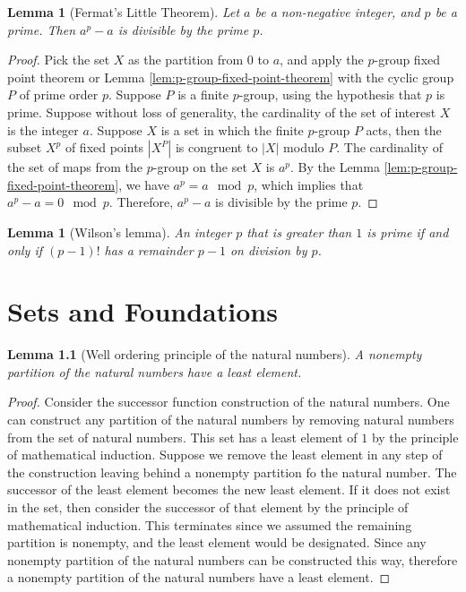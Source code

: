 \documentclass{tufte-book}
\newtheorem{lemma}[theorem]{Lemma}
\begin{document}
\begin{lemma}[Fermat's Little Theorem]
  Let $a$ be a non-negative integer, and $p$ be a prime.
  Then $a^p - a$ is divisible by the prime $p$. 
\end{lemma}

\begin{proof}
  Pick the set $X$ as the partition from $0$ to $a$, and apply the $p$-group fixed point theorem or Lemma \ref{lem:p-group-fixed-point-theorem} with the cyclic group $P$ of prime order $p$.
  Suppose $P$ is a finite $p$-group, using the hypothesis that $p$ is prime.
  Suppose without loss of generality, the cardinality of the set of interest $X$ is the integer $a$.
  Suppose $X$ is a set in which the finite $p$-group $P$ acts, then the subset $X^{p}$ of fixed points $|X^P|$ is congruent to $|X|$ modulo $P$. The cardinality of the set of maps from the $p$-group on the set $X$ is 
  $a^p$. By the Lemma \ref{lem:p-group-fixed-point-theorem}, we have $a^p = a \mod p$, which implies that $a^p - a = 0 \mod p$. Therefore, $a^p - a$ is divisible by the prime $p$.
\end{proof}

\begin{lemma}[Wilson's lemma]
	An integer $p$ that is greater than $1$ is prime if and only if $(p-1)!$ has a remainder $p-1$ on division by $p$.
\end{lemma}

\chapter{Sets and Foundations}

\begin{lemma}[Well ordering principle of the natural numbers]
  A nonempty partition of the natural numbers have a least element.
\end{lemma}

\begin{proof}
  Consider the successor function construction of the natural numbers.
  One can construct any partition of the natural numbers by removing natural numbers from the set of natural numbers.
  This set has a least element of $1$ by the principle of mathematical induction.
  Suppose we remove the least element in any step of the construction leaving behind a nonempty partition fo the natural number. 
  The successor of the least element becomes the new least element. If it does not exist in the set, then consider the successor of that element by the principle of mathematical induction. This terminates since we assumed the remaining partition is nonempty, and the least element would be designated. Since any nonempty partition of the natural numbers can be constructed this way, therefore a nonempty partition of the natural numbers have a least element.
\end{proof}
\end{document}
